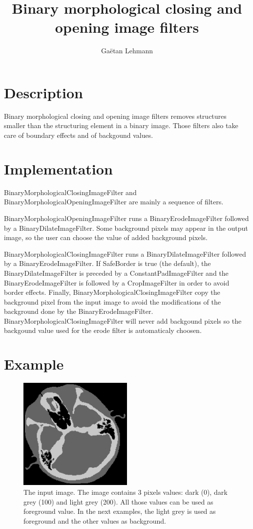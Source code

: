 \documentclass[IJ]{cesj}
\author{Ga\"etan Lehmann}
\institute{Biologie du d\'eveloppement et de la reproduction, INRA de Jouy-en-Josas}
\title{Binary morphological closing and opening image filters}
\begin{document}
\lstset{language=c++}
\maketitle

\section{Description}
Binary morphological closing and opening image filters removes structures smaller than the structuring element in a binary image. Those filters also take care of boundary effects and of backgound values.

\section{Implementation}
BinaryMorphologicalClosingImageFilter and BinaryMorphologicalOpeningImageFilter are mainly a sequence of filters.

BinaryMorphologicalOpeningImageFilter runs a BinaryErodeImageFilter followed by a BinaryDilateImageFilter. Some background pixels may appear in the output image, so the user can choose the value of added background pixels.

BinaryMorphologicalClosingImageFilter runs a BinaryDilateImageFilter followed by a BinaryErodeImageFilter. If SafeBorder is true (the default), the BinaryDilateImageFilter is preceded by a ConstantPadImageFilter and the BinaryErodeImageFilter is followed by a CropImageFilter in order to avoid border effects. Finally, BinaryMorphologicalClosingImageFilter copy the background pixel from the input image to avoid the modifications of the background done by the BinaryErodeImageFilter. BinaryMorphologicalClosingImageFilter will never add backgound pixels so the backgound value used for the erode filter is automaticaly choosen.
\section{Example}

\begin{figure}[b]
\centering
\includegraphics[width=0.5\textwidth]{2th_cthead1.eps}
\caption{The input image. The image contains 3 pixels values: dark (0), dark grey (100) and light grey (200). All those values can be used as foreground value. In the next examples, the light grey is used as foreground and the other values as background.}
\end{figure}
\end{document}
